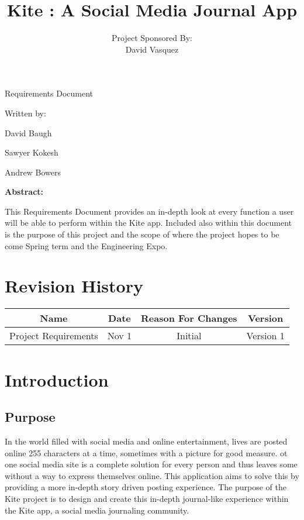 \documentclass[letterpaper, 10, draftclsnofoot, onecolumn]{IEEEtran}
\date{}
\title{Kite : A Social Media Journal App}
\author{ %
	Project Sponsored By: \\
    David Vasquez
}
\begin{document}
\null  %
\nointerlineskip  %
\vfill
\let\snewpage \newpage
\let\newpage \relax
\maketitle
\begin{center}
\huge{Requirements Document}\par
\vspace{2mm}
\large{Written by:}\par
\normalsize{David Baugh}\par
\normalsize{Sawyer Kokesh}\par
\normalsize{Andrew Bowers}\par
\vspace{8mm}
\large{\textbf{Abstract:}}\par 
\vspace{2mm}
\normalsize{This Requirements Document provides an in-depth look at every function a user will be able to perform within the Kite app. Included also within this document is the purpose of this project and the scope of where the project hopes to be come Spring term and the Engineering Expo.}
\end{center}
\let \newpage \snewpage
\vfill 
\break %

\tableofcontents


\section*{Revision History}

\begin{center}
    \begin{tabular}{|c|c|c|c|}
        \hline
	    Name & Date & Reason For Changes & Version\\
        \hline
	    Project Requirements & Nov 1 & Initial & Version 1\\
        \hline
    \end{tabular}
\end{center}

\section{Introduction}

\subsection{Purpose}
In the world filled with social media and online entertainment, lives are 
posted online 255 characters at a time, sometimes with a picture for good measure. 
ot one social media site is a complete solution for every person and thus leaves 
some without a way to express themselves online. This application aims to solve 
this by providing a more in-depth story driven posting experience. The purpose of 
the Kite project is to design and create this in-depth journal-like experience 
within the Kite app, a social media journaling community.
\end{document}
